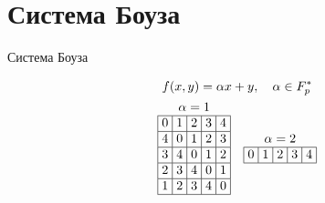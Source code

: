 \documentclass[8pt, hyperref={pdftex,unicode}]{beamer}
\begin{document}
\section{Система Боуза}
\begin{frame}{Система Боуза}

    \begin{block}{}
        \begin{gather*}
            f(x,y)= \alpha x + y, \quad \alpha \in F_p^*\\
            \begin{array}{|>{\hspace{-2pt}}c<{\hspace{-2pt}}|>{\hspace{-2pt}}c<{\hspace{-2pt}}|>{\hspace{-2pt}}c<{\hspace{-2pt}}|>{\hspace{-2pt}}c<{\hspace{-2pt}}|>{\hspace{-2pt}}c<{\hspace{-2pt}}|}
                \multicolumn{5}{c}{\alpha = 1} \\ \hline
                0 & 1 & 2 & 3 & 4              \\ \hline
                4 & 0 & 1 & 2 & 3              \\ \hline
                3 & 4 & 0 & 1 & 2              \\ \hline
                2 & 3 & 4 & 0 & 1              \\ \hline
                1 & 2 & 3 & 4 & 0              \\ \hline
            \end{array}\hspace{1em}
            \begin{array}{|>{\hspace{-2pt}}c<{\hspace{-2pt}}|>{\hspace{-2pt}}c<{\hspace{-2pt}}|>{\hspace{-2pt}}c<{\hspace{-2pt}}|>{\hspace{-2pt}}c<{\hspace{-2pt}}|>{\hspace{-2pt}}c<{\hspace{-2pt}}|}
                \multicolumn{5}{c}{\alpha = 2} \\ \hline
                0 & 1 & 2 & 3 & 4              \\ \hline

\end{array}
\end{gather*}
\end{block}
\end{frame}
\end{document}
